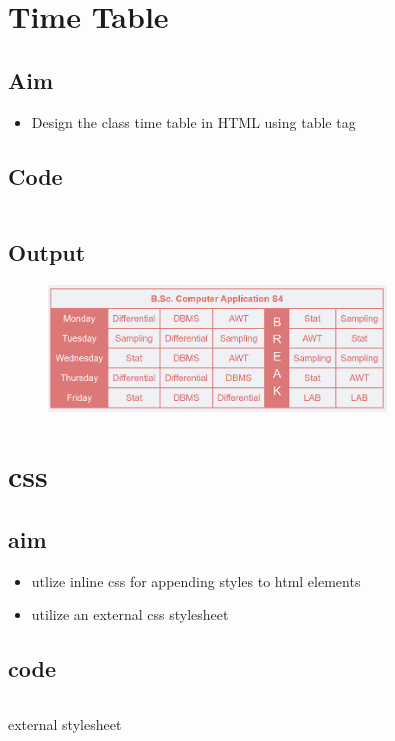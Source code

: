\documentclass{article}
\begin{document}
\section{Time Table}
\subsection{Aim}
\begin{itemize}
	\item Design the class time table in HTML using table tag
\end{itemize}

\subsection{Code}
\inputminted[frame=lines, linenos, breaklines, breakanywhere, numberblanklines=false]{html}{./prog_2/index.html}

\subsection{Output}
\begin{figure}[h!]
	\centering
	\includegraphics[width=0.8\textwidth]{./Assets/p0201.png}
\end{figure}
\newpage

\section{css}
\subsection{aim}
\begin{itemize}
	\item utlize inline css for appending styles to html elements
	\item utilize an external css stylesheet
\end{itemize}

\subsection{code}
\inputminted[frame=lines, linenos, breaklines, breakanywhere, numberblanklines=false]{html}{./prog_3/index.html}
external stylesheet
\inputminted[frame=lines, linenos, breaklines, breakanywhere, numberblanklines=false]{css}{./prog_3/styles.css}
\end{document}
